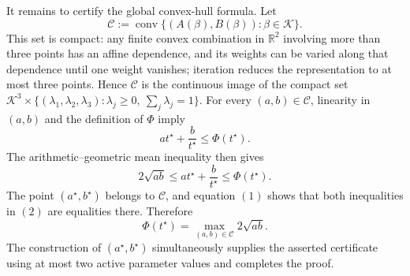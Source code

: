 It remains to certify the global convex-hull formula.  Let
\[
 \mathcal C:=\operatorname{conv}
 \{(A(\beta),B(\beta)):\beta\in\mathcal K\}.
\]
This set is compact: any finite convex combination in \(\mathbb R^2\) involving more than three points has an affine dependence, and its weights can be varied along that dependence until one weight vanishes; iteration reduces the representation to at most three points.  Hence \(\mathcal C\) is the continuous image of the compact set \(\mathcal K^3\times\{(\lambda_1,\lambda_2,\lambda_3):\lambda_j\ge0,\ \sum_j\lambda_j=1\}\).  For every \((a,b)\in\mathcal C\), linearity in \((a,b)\) and the definition of \(\Phi\) imply
\[
 at^\star+\frac{b}{t^\star}\le\Phi(t^\star).
\]
The arithmetic--geometric mean inequality then gives
\[
 2\sqrt{ab}
 \le at^\star+\frac{b}{t^\star}
 \le\Phi(t^\star).
\tag{2}
\]
The point \((a^\star,b^\star)\) belongs to \(\mathcal C\), and equation \((1)\) shows that both inequalities in \((2)\) are equalities there.  Therefore
\[
 \Phi(t^\star)
 =\max_{(a,b)\in\mathcal C}2\sqrt{ab}.
\]
The construction of \((a^\star,b^\star)\) simultaneously supplies the asserted certificate using at most two active parameter values and completes the proof.

